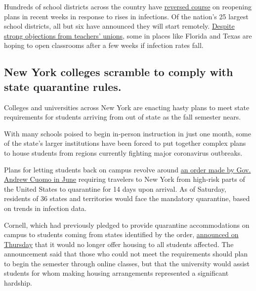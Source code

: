 Hundreds of school districts across the country have
\href{https://www.nytimes3xbfgragh.onion/2020/07/13/us/lausd-san-diego-school-reopening.html}{reversed
course} on reopening plans in recent weeks in response to rises in
infections. Of the nation's 25 largest school districts, all but six
have announced they will start remotely.
\href{https://www.nytimes3xbfgragh.onion/2020/07/29/us/teacher-union-school-reopening-coronavirus.html}{Despite
strong objections from teachers' unions}, some in places like Florida
and Texas are hoping to open classrooms after a few weeks if infection
rates fall.

\hypertarget{new-york-colleges-scramble-to-comply-with-state-quarantine-rules}{%
\subsection{New York colleges scramble to comply with state quarantine
rules.}\label{new-york-colleges-scramble-to-comply-with-state-quarantine-rules}}

Colleges and universities across New York are enacting hasty plans to
meet state requirements for students arriving from out of state as the
fall semester nears.

With many schools poised to begin in-person instruction in just one
month, some of the state's larger institutions have been forced to put
together complex plans to house students from regions currently fighting
major coronavirus outbreaks.

Plans for letting students back on campus revolve around
\href{https://www.nytimes3xbfgragh.onion/2020/06/24/nyregion/ny-coronavirus-states-quarantine.html}{an
order made by Gov. Andrew Cuomo in June} requiring travelers to New York
from high-risk parts of the United States to quarantine for 14 days upon
arrival. As of Saturday, residents of 36 states and territories would
face the mandatory quarantine, based on trends in infection data.

Cornell, which had previously pledged to provide quarantine
accommodations on campus to students coming from states identified by
the order,
\href{https://covid.cornell.edu/updates/20200730-important-updates.cfm}{announced
on Thursday} that it would no longer offer housing to all students
affected. The announcement said that those who could not meet the
requirements should plan to begin the semester through online classes,
but that the university would assist students for whom making housing
arrangements represented a significant hardship.

